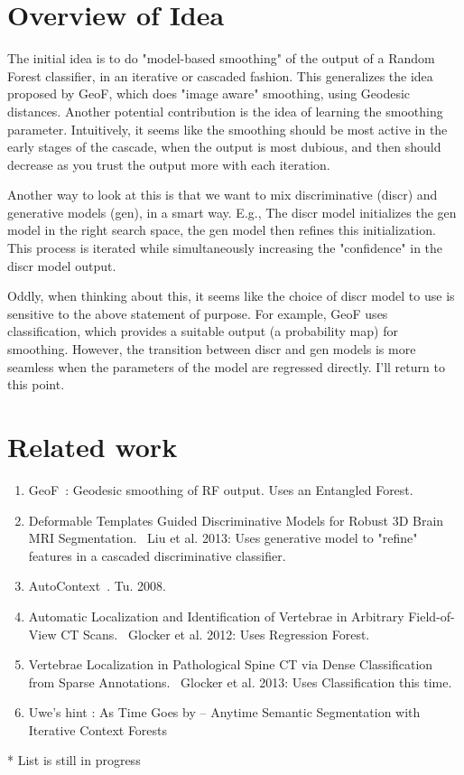 \documentclass[10pt,twocolumn,letterpaper]{article}
\begin{document}
\section{Overview of Idea}

The initial idea is to do "model-based smoothing" of the output of a Random Forest classifier, in an iterative or cascaded fashion.  This generalizes the idea proposed by GeoF, which does "image aware" smoothing, using Geodesic distances.  Another potential contribution is the idea of learning the smoothing parameter.  Intuitively, it seems like the smoothing should be most active in the early stages of the cascade, when the output is most dubious, and then should decrease as you trust the output more with each iteration.

Another way to look at this is that we want to mix discriminative (discr) and generative models (gen), in a smart way.  E.g., The discr model initializes the gen model in the right search space, the gen model then refines this initialization.  This process is iterated while simultaneously increasing the "confidence" in the discr model output.

Oddly, when thinking about this, it seems like the choice of discr model to use is sensitive to the above statement of purpose.  For example, GeoF uses classification, which provides a suitable output (a probability map) for smoothing.  However, the transition between discr and gen models is more seamless when the parameters of the model are regressed directly.  I'll return to this point.

\section{Related work}

\begin{enumerate}
\item GeoF~\cite{GeoForests2013}: Geodesic smoothing of RF output.  Uses an Entangled Forest.
\item Deformable Templates Guided Discriminative Models for Robust 3D Brain MRI Segmentation.~\cite{BrainSeg2013}  Liu et al.  2013: Uses generative model to "refine" features in a cascaded discriminative classifier.
\item AutoContext~\cite{AutoContext2008}.  Tu.  2008.
\item Automatic Localization and Identification of Vertebrae in Arbitrary Field-of-View CT Scans.~\cite{Glocker2012} Glocker et al.  2012: Uses Regression Forest.
\item Vertebrae Localization in Pathological Spine CT via Dense Classification from Sparse Annotations.~\cite{Glocker2013} Glocker et al.  2013: Uses Classification this time.
\item Uwe's hint \cite{Denzler2012}: As Time Goes by -- Anytime Semantic Segmentation with Iterative Context Forests
\end{enumerate}
* List is still in progress
\end{document}
